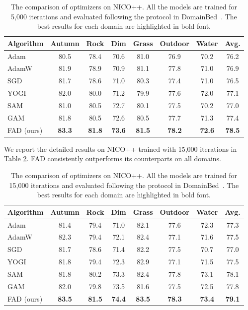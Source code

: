 \begin{table}[th]
\centering
\caption{The comparison of optimizers on NICO++. All the models are trained for 5,000 iterations and evaluated following the protocol in DomainBed~\cite{gulrajani2020search}. The best results for each domain are highlighted in bold font.}
\begin{tabular}{lcccccc|c}
\toprule
\textbf{Algorithm} & Autumn & Rock & Dim & Grass  & Outdoor & Water &\textbf{Avg.} \\
\midrule

Adam  & 80.5 & 78.4 & 70.6 & 81.0 & 76.9 & 70.2 & 76.2 \\
AdamW  & 81.9 & 78.9  & 70.9 & 81.1 & 77.8 & 71.0 & 76.9 \\
SGD  & 81.7 & 78.6 & 71.0 & 80.3 & 77.4 & 71.0 & 76.5 \\
YOGI  & 82.0 & 80.0 & 71.2 & 79.9 & 77.6 & 72.0 & 77.1 \\
SAM  & 81.0 & 80.5  & 72.7 & 80.1 & 77.5 & 70.2 & 77.0\\
GAM  & 81.8 & 80.5  & 72.6 & 80.5 & 77.7 & 71.3 & 77.4\\
\midrule
FAD (ours)  &  \textbf{83.3} & \textbf{81.8}   & \textbf{73.6}  & \textbf{81.5}  & \textbf{78.2}  & \textbf{72.6}  &  \textbf{78.5}\\

\bottomrule
\end{tabular}
\label{tab:nico5k}
\end{table}

We report the detailed results on NICO++ trained with 15,000 iterations in Table \ref{tab:nico15k}. FAD consistently outperforms its counterparts on all domains.

\begin{table}[th]
\centering
\caption{The comparison of optimizers on NICO++. All the models are trained for 15,000 iterations and evaluated following the protocol in DomainBed~\cite{gulrajani2020search}. The best results for each domain are highlighted in bold font.}
\begin{tabular}{lcccccc|c}
\toprule
\textbf{Algorithm} & Autumn & Rock & Dim & Grass  & Outdoor & Water &\textbf{Avg.} \\
\midrule

Adam  & 81.4 & 79.4 & 71.0 & 82.1  & 77.6 & 72.3  &  77.3\\
AdamW  & 82.3 & 79.4 & 72.1 & 82.4  & 77.1 & 71.6 & 77.5 \\
SGD  & 81.7 & 78.6 & 71.4 & 82.2 & 77.5 & 70.7 & 77.0 \\
YOGI  & 81.8 & 79.4 & 72.3 & 82.9 & 77.1 & 71.5 & 77.5 \\
SAM  & 81.8 & 80.2 & 73.3 & 82.4 & 77.8 & 73.1 & 78.1 \\
GAM  & 82.0 & 79.8 & 73.5 & 81.6 & 77.5 & 72.5 & 77.8\\
\midrule
FAD (ours)  & \textbf{83.5} & \textbf{81.5} & \textbf{74.4}  & \textbf{83.5} & \textbf{78.3} & \textbf{73.4}  & \textbf{79.1} \\

\bottomrule
\end{tabular}
\label{tab:nico15k}
\end{table}





